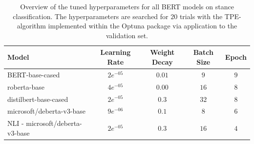 \begin{table}[htbp]
\centering
\begin{tabular}{lcccc}
\toprule
Model & Learning Rate & Weight Decay & Batch Size & Epoch \\
\midrule
BERT-base-cased & $2e^{-05}$ & $0.01$ & $9$ & $9$ \\
roberta-base & $4e^{-05}$ & $0.00$ & $16$ & $8$ \\
distilbert-base-cased & $2e^{-05}$ & $0.3$ & $32$ & $8$ \\
microsoft/deberta-v3-base & $9e^{-06}$ & $0.1$ & $8$ & $6$ \\
NLI - microsoft/deberta-v3-base & $2e^{-05}$ & $0.3$ & $16$ & $4$ \\
\bottomrule
\end{tabular}
\caption[Tuned hyperparameters for BERT models on stance classification]{Overview of the tuned hyperparameters for all BERT models on stance classification. The hyperparameters are searched for $20$ trials with the TPE-algorithm implemented within the Optuna package \parencite{akiba_optuna_2019} via application to the validation set.}\label{tab:tuned_hyperparams_bert_stance}
\end{table}